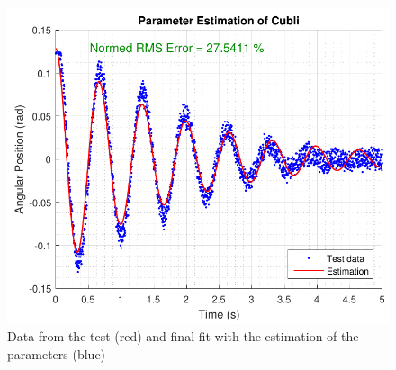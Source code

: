\begin{figure}[H]
	\centering
	\includegraphics[scale=0.65]{figures/paramEstFibonacci}
	\caption{Data from the test (red) and final fit with the estimation of the parameters (blue)}
	\label{paramEstFibonacci}
\end{figure}